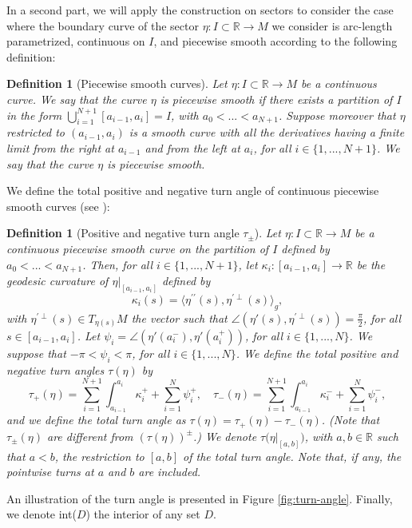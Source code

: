 \documentclass{article}
\newcommand{\R}{\mathbb{R}}
\newcommand{\surf}{M}
\newcommand{\ko}{\kappa}
\newtheorem{definitionE}[theorem]{Definition}
\theoremstyle{remark}
\theoremstyle{prpart}
\begin{document}
In a second part, we will apply the construction on sectors to consider the case where the boundary curve of the sector $\eta:I\subset \R\to\surf$ we consider is arc-length parametrized, continuous on $I$, and piecewise smooth according to the following definition:
\begin{definitionE}[Piecewise smooth curves]\label{def:piecewise}
  Let $\eta:I\subset \R\to\surf$ be a continuous curve. We say that the curve $\eta$ is \emph{piecewise smooth} if there exists a partition of $I$ in the form $\bigcup_{i=1}^{N+1} [a_{i-1},a_i]=I$, with $a_0<...<a_{N+1}$. Suppose moreover that $\eta$ restricted to $(a_{i-1},a_{i})$ is a smooth curve with all the derivatives having a finite limit from the right at $a_{i-1}$ and from the left at $a_{i}$, for all $i\in\{1,...,N+1\}$. We say that the curve $\eta$ is piecewise smooth.
\end{definitionE}
We define the total positive and negative turn angle of continuous piecewise smooth curves (see \cite{Bur05}):
\begin{definitionE}[Positive and negative turn angle $\tau_\pm$]
 Let $\eta:I\subset\R\to\surf$ be a continuous piecewise smooth curve on the partition of $I$ defined by $a_0<...<a_{N+1}$. Then, for all $i\in\{1,...,N+1\}$, let $\ko_i:[a_{i-1},a_{i}]\to\R$ be the geodesic curvature of $\eta\big|_{[a_{i-1},a_{i}]}$ defined by 
\begin{equation*}
  \ko_i(s) = \langle \eta^{\prime\prime}(s), \eta^{\prime\perp}(s)\rangle_g,
\end{equation*}
with $\eta^{\prime\perp}(s)\in T_{\eta(s)}\surf$ the vector such that $\angle(\eta'(s),\eta^{\prime\perp}(s))=\frac{\pi}{2}$, for all $s\in [a_{i-1},a_{i}]$.
Let $\psi_i = \angle(\eta'(a_i^-),\eta'(a_i^+))$, for all $i\in\{1,...,N\}$. We suppose that $-\pi<\psi_i<\pi$, for all $i\in\{1,...,N\}$. We define the total positive and negative \emph{turn angles} $\tau(\eta)$ by
\begin{equation}\label{eq:int-curv}
\tau_+(\eta) = \sum_{i=1}^{N+1}\int_{a_{i-1}}^{a_{i}}\ko_i^+ + \sum_{i=1}^N\psi_i^+,
\quad \tau_-(\eta) = \sum_{i=1}^{N+1}\int_{a_{i-1}}^{a_{i}}\ko_i^- + \sum_{i=1}^N\psi_i^-,
\end{equation}
and we define the total \emph{turn angle} as $\tau(\eta) = \tau_+(\eta)-\tau_-(\eta)$. (Note that $\tau_{\pm}(\eta)$ are different from $(\tau(\eta))^\pm$.) We denote $\tau\big(\eta\big|_{[a,b]})$, with $a,b\in\R$ such that $a<b$, the restriction to $[a,b]$ of the total turn angle. Note that, if any, the pointwise turns at $a$ and $b$ are included.
\end{definitionE}
An illustration of the turn angle is presented in Figure \ref{fig:turn-angle}. Finally, we denote int($D$) the interior of any set $D$. 
\end{document}
